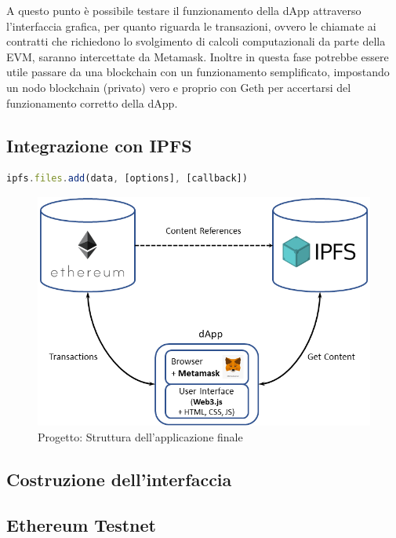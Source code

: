 A questo punto è possibile testare il funzionamento della dApp attraverso l'interfaccia grafica, per quanto riguarda le transazioni, ovvero le chiamate ai contratti che richiedono lo svolgimento di calcoli computazionali da parte della EVM, saranno intercettate da Metamask. Inoltre in questa fase potrebbe essere utile passare da una blockchain con un funzionamento semplificato,  impostando un nodo blockchain (privato) vero e proprio con Geth per accertarsi del funzionamento corretto della dApp.

\subsection{Integrazione con IPFS}

\begin{lstlisting}[caption={Aggiunta di file con IPFS Javascript API},language=JavaScript]
ipfs.files.add(data, [options], [callback])
\end{lstlisting}

\begin{figure}[H]
\centering
\includegraphics[width=1\textwidth]{immagini/ipfsIntegration.png}
\caption{Progetto: Struttura dell'applicazione finale}
\label{fig:dapp}
\end{figure}

\subsection{Costruzione dell'interfaccia}

\subsection{Ethereum Testnet}



